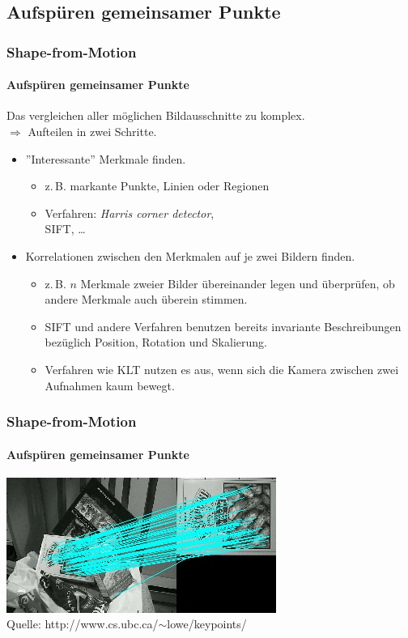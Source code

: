 \documentclass{beamer}
\begin{document}
\subsection{Aufspüren gemeinsamer Punkte}
\begin{frame}
	\frametitle{Shape-from-Motion}
	\framesubtitle{Aufspüren gemeinsamer Punkte}
	
	Das vergleichen aller möglichen Bildausschnitte zu komplex. \pause \\
	$\Rightarrow$ Aufteilen in zwei Schritte.
	
	\begin{itemize}
		\item ''Interessante'' Merkmale finden.
			\begin{itemize}
				\item<3-> z.\,B. markante Punkte, Linien oder Regionen
				\item<3-> Verfahren: \emph{Harris corner detector}, \\
				\acf{SIFT}, \dots
			\end{itemize}
		\item Korrelationen zwischen den Merkmalen auf je zwei Bildern finden.
			\begin{itemize}
				\item<4-> z.\,B. $n$ Merkmale zweier Bilder übereinander legen und überprüfen, ob andere Merkmale auch überein stimmen.
				\item<4-> \ac{SIFT} und andere Verfahren benutzen bereits invariante Beschreibungen bezüglich Position, Rotation und Skalierung.
				\item<4-> Verfahren wie \ac{KLT} nutzen es aus, wenn sich die Kamera zwischen zwei Aufnahmen kaum bewegt.
			\end{itemize}
	\end{itemize}
\end{frame}


\begin{frame}
	\frametitle{Shape-from-Motion}
	\framesubtitle{Aufspüren gemeinsamer Punkte}
	
	\begin{center}
		\includegraphics[width=\linewidth]{includes/sift}\\
		Quelle: http://www.cs.ubc.ca/$\sim$lowe/keypoints/
	\end{center}
\end{frame}
\end{document}
